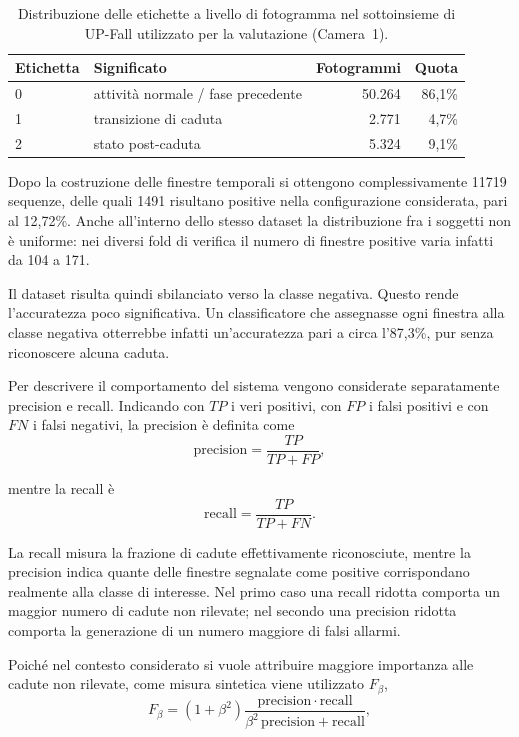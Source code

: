\begin{table}[ht]
\centering
\caption{Distribuzione delle etichette a livello di fotogramma nel sottoinsieme
di UP-Fall utilizzato per la valutazione (Camera~1).}
\label{tab:etichette}
\begin{tabular}{llrr}
\toprule
\textbf{Etichetta} & \textbf{Significato} &
\textbf{Fotogrammi} & \textbf{Quota} \\
\midrule
0 & attività normale / fase precedente & 50.264 & 86,1\% \\
1 & transizione di caduta & 2.771 & 4,7\% \\
2 & stato post-caduta & 5.324 & 9,1\% \\
\bottomrule
\end{tabular}
\end{table}

Dopo la costruzione delle finestre temporali si ottengono complessivamente \num{11719} sequenze, delle quali \num{1491} risultano positive nella configurazione considerata, pari al 12,72\%. Anche all'interno dello stesso dataset la distribuzione fra i soggetti non è uniforme: nei diversi fold di verifica il numero di finestre positive varia infatti da 104 a 171.

Il dataset risulta quindi sbilanciato verso la classe negativa. Questo rende l'accuratezza poco significativa. Un classificatore che assegnasse ogni finestra alla classe negativa otterrebbe infatti un'accuratezza pari a circa l'87,3\%, pur senza riconoscere alcuna caduta.

Per descrivere il comportamento del sistema vengono considerate separatamente precision e recall. Indicando con $TP$ i veri positivi, con $FP$ i falsi positivi e con $FN$ i falsi negativi, la precision è definita come
\[
\mathrm{precision}
=
\frac{TP}{TP+FP},
\]

mentre la recall è
\[
\mathrm{recall}
=
\frac{TP}{TP+FN}.
\]

La recall misura la frazione di cadute effettivamente riconosciute, mentre la precision indica quante delle finestre segnalate come positive corrispondano realmente alla classe di interesse. Nel primo caso una recall ridotta comporta un maggior numero di cadute non rilevate; nel secondo una precision ridotta comporta la generazione di un numero maggiore di falsi allarmi.

Poiché nel contesto considerato si vuole attribuire maggiore importanza alle cadute non rilevate, come misura sintetica viene utilizzato $F_\beta$,
\[
F_\beta =
(1+\beta^2)
\frac{\mathrm{precision}\cdot\mathrm{recall}}
     {\beta^2\,\mathrm{precision}+\mathrm{recall}},
\]

